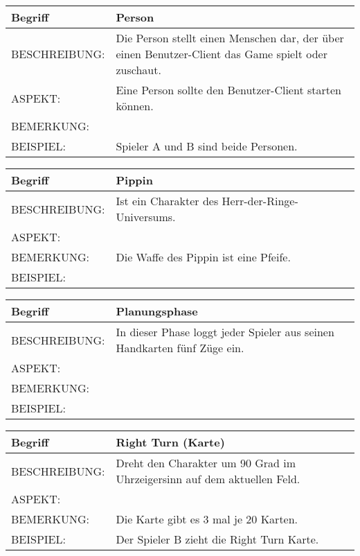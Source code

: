 \documentclass{uulm-assignment}
\begin{document}
	     \begin{tabularx}{\textwidth}{|l|X |} \hline
	        \textbf{Begriff} & \textbf{Person} \\
	        \hline
	        BESCHREIBUNG: & Die Person stellt einen Menschen dar, der über einen Benutzer-Client das Game spielt oder zuschaut. \\
	        \hline
	        ASPEKT: &Eine Person sollte den Benutzer-Client starten können.
	        \\
	        \hline
	        BEMERKUNG: &  \\
	        \hline
	        BEISPIEL: & Spieler A und B sind beide Personen.\\
	        \hline
	    \end{tabularx}

	     \begin{tabularx}{\textwidth}{|l|X |} \hline
	        \textbf{Begriff} & \textbf{Pippin } \\
	        \hline
	        BESCHREIBUNG: & Ist ein Charakter des Herr-der-Ringe-Universums. \\
	        \hline
	        ASPEKT: &
	        \\
	        \hline
	        BEMERKUNG: & Die Waffe des Pippin ist eine Pfeife. \\
	        \hline
	        BEISPIEL: & \\
	        \hline
	    \end{tabularx}

	     \begin{tabularx}{\textwidth}{|l|X |} \hline
	        \textbf{Begriff} & \textbf{Planungsphase} \\
	        \hline
	        BESCHREIBUNG: & In dieser Phase loggt jeder Spieler aus seinen Handkarten fünf Züge ein. \\
	        \hline
	        ASPEKT: &
	        \\
	        \hline
	        BEMERKUNG: &  \\
	        \hline
	        BEISPIEL: & \\
	        \hline
	    \end{tabularx}

	     \begin{tabularx}{\textwidth}{|l|X |} \hline
	        \textbf{Begriff} & \textbf{Right Turn (Karte)} \\
	        \hline
	        BESCHREIBUNG: & Dreht den Charakter um 90 Grad im Uhrzeigersinn auf dem aktuellen Feld. \\
	        \hline
	        ASPEKT: &
	        \\
	        \hline
	        BEMERKUNG: &  Die Karte gibt es 3 mal je 20 Karten.\\
	        \hline
	        BEISPIEL: & Der Spieler B zieht die Right Turn Karte. \\
	        \hline
	    \end{tabularx}
\end{document}
